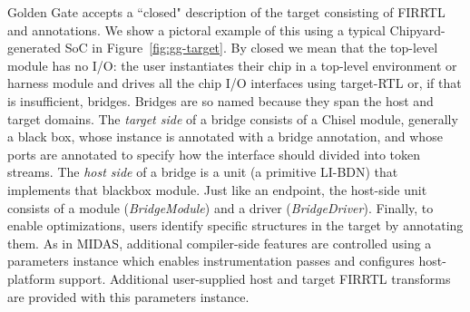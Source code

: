 Golden Gate accepts a ``closed" description of the target
consisting of FIRRTL and annotations. We show a pictoral example of this using
a typical Chipyard-generated SoC in Figure~\ref{fig:gg-target}. By closed we
mean that the top-level module has no I/O: the user instantiates their chip in
a top-level
environment or harness module and drives all the chip I/O interfaces using target-RTL
or, if that is insufficient, bridges. Bridges are so named because they span
the host and target domains. The \emph{target side} of a bridge consists of a
Chisel module, generally a black box, whose instance is annotated with a bridge annotation,
and whose ports are annotated to specify how the
interface should divided into token streams. The \emph{host side} of a bridge is a unit (a
primitive LI-BDN) that implements that blackbox module. Just like an endpoint,
the host-side unit consists of a module (\emph{BridgeModule}) and a driver
(\emph{BridgeDriver}). Finally, to enable optimizations, users
identify specific structures in the target by annotating them. As in MIDAS, additional compiler-side features are controlled using a
parameters instance which enables instrumentation passes and configures host-platform support.
Additional user-supplied host and target FIRRTL transforms are provided with this parameters instance.

